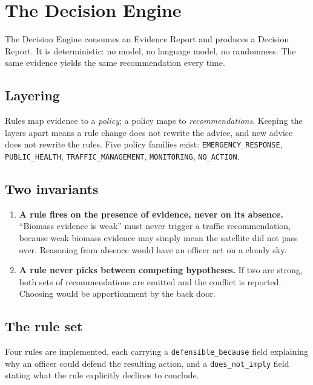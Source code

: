 \documentclass[11pt,a4paper]{article}
\newcommand{\code}[1]{\texttt{\small #1}}
\begin{document}
\section{The Decision Engine}

The Decision Engine consumes an Evidence Report and produces a Decision Report. It
is deterministic: no model, no language model, no randomness. The same evidence
yields the same recommendation every time.

\subsection{Layering}

Rules map evidence to a \emph{policy}; a policy maps to \emph{recommendations}.
Keeping the layers apart means a rule change does not rewrite the advice, and new
advice does not rewrite the rules. Five policy families exist:
\code{EMERGENCY\_RESPONSE}, \code{PUBLIC\_HEALTH}, \code{TRAFFIC\_MANAGEMENT},
\code{MONITORING}, \code{NO\_ACTION}.

\subsection{Two invariants}

\begin{enumerate}
  \item \textbf{A rule fires on the presence of evidence, never on its absence.}
  ``Biomass evidence is weak'' must never trigger a traffic recommendation, because
  weak biomass evidence may simply mean the satellite did not pass over. Reasoning
  from absence would have an officer act on a cloudy sky.
  \item \textbf{A rule never picks between competing hypotheses.} If two are
  strong, both sets of recommendations are emitted and the conflict is reported.
  Choosing would be apportionment by the back door.
\end{enumerate}

\subsection{The rule set}

Four rules are implemented, each carrying a \code{defensible\_because} field
explaining why an officer could defend the resulting action, and a
\code{does\_not\_imply} field stating what the rule explicitly declines to conclude.
\end{document}
